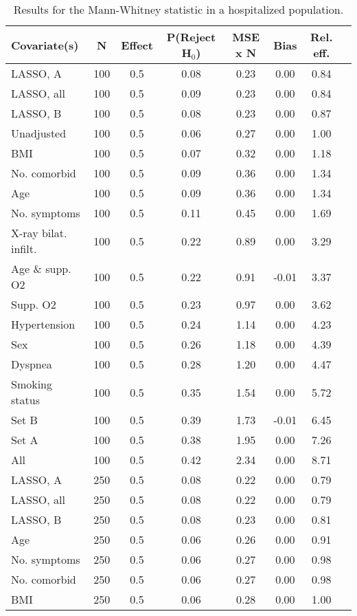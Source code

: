 \documentclass{article}
\begin{document}
{\tabcolsep=6pt  %
\begin{longtable}{lccccccc}
\caption{Results for the Mann-Whitney statistic in a hospitalized population.}\label{tab16}\\
Covariate(s) & N & Effect & P(Reject H$_0$) & MSE x N & Bias & Rel. eff.\\ \midrule
LASSO, A & 100 & 0.5 & 0.08 & 0.23 & 0.00 & 0.84\\
LASSO, all & 100 & 0.5 & 0.09 & 0.23 & 0.00 & 0.84\\
LASSO, B & 100 & 0.5 & 0.08 & 0.23 & 0.00 & 0.87\\
Unadjusted & 100 & 0.5 & 0.06 & 0.27 & 0.00 & 1.00\\
BMI & 100 & 0.5 & 0.07 & 0.32 & 0.00 & 1.18\\
No. comorbid & 100 & 0.5 & 0.09 & 0.36 & 0.00 & 1.34\\
Age & 100 & 0.5 & 0.09 & 0.36 & 0.00 & 1.34\\
No. symptoms & 100 & 0.5 & 0.11 & 0.45 & 0.00 & 1.69\\
X-ray bilat. infilt. & 100 & 0.5 & 0.22 & 0.89 & 0.00 & 3.29\\
Age \& supp. O2 & 100 & 0.5 & 0.22 & 0.91 & -0.01 & 3.37\\
Supp. O2 & 100 & 0.5 & 0.23 & 0.97 & 0.00 & 3.62\\
Hypertension & 100 & 0.5 & 0.24 & 1.14 & 0.00 & 4.23\\
Sex & 100 & 0.5 & 0.26 & 1.18 & 0.00 & 4.39\\
Dyspnea & 100 & 0.5 & 0.28 & 1.20 & 0.00 & 4.47\\
Smoking status & 100 & 0.5 & 0.35 & 1.54 & 0.00 & 5.72\\
Set B & 100 & 0.5 & 0.39 & 1.73 & -0.01 & 6.45\\
Set A & 100 & 0.5 & 0.38 & 1.95 & 0.00 & 7.26\\
All & 100 & 0.5 & 0.42 & 2.34 & 0.00 & 8.71\\ \midrule
LASSO, A & 250 & 0.5 & 0.08 & 0.22 & 0.00 & 0.79\\
LASSO, all & 250 & 0.5 & 0.08 & 0.22 & 0.00 & 0.79\\
LASSO, B & 250 & 0.5 & 0.08 & 0.23 & 0.00 & 0.81\\
Age & 250 & 0.5 & 0.06 & 0.26 & 0.00 & 0.91\\
No. symptoms & 250 & 0.5 & 0.06 & 0.27 & 0.00 & 0.98\\
No. comorbid & 250 & 0.5 & 0.06 & 0.27 & 0.00 & 0.98\\
BMI & 250 & 0.5 & 0.06 & 0.28 & 0.00 & 1.00\\

\end{longtable}}
\end{document}
